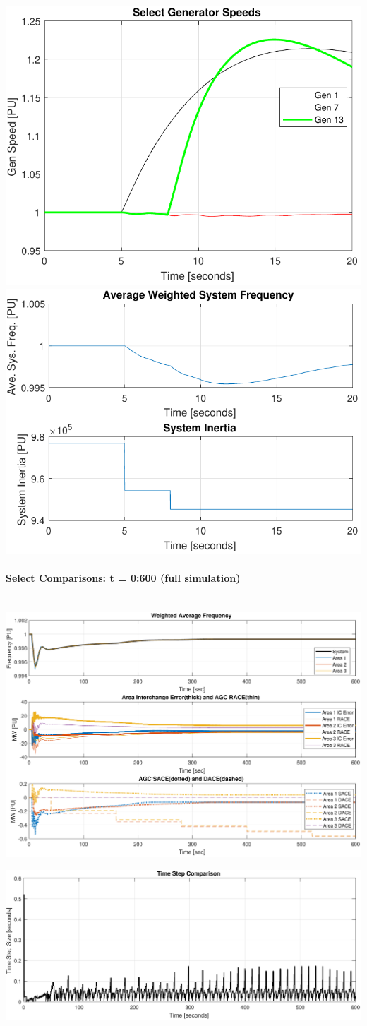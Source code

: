 \documentclass[12pt]{article}
\begin{document}
\begin{center}
\includegraphics[width=.45\linewidth]{genTripSPD01}%
\includegraphics[width=.45\linewidth]{genTripFnH01}%
\end{center}


\pagebreak
\paragraph{Select Comparisons: t = 0:600 (full simulation)} \ \\

\includegraphics[width=\linewidth]{genTripAGC01}


\includegraphics[width=\linewidth]{genTripteps01}
\end{document}
